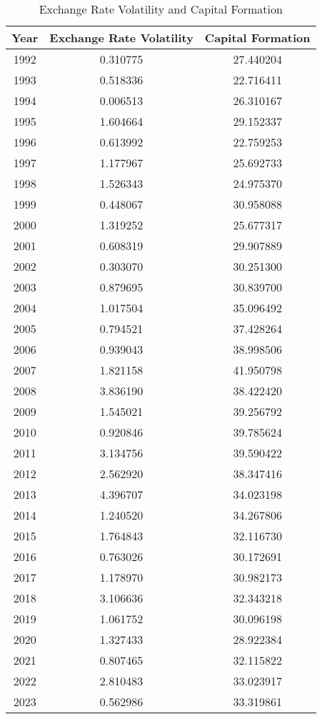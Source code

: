 \documentclass{article} %
\begin{document}
\begin{table}[h]
    \centering
    \caption{Exchange Rate Volatility and Capital Formation}
    \begin{tabular}{ccc}
        \toprule
        Year & Exchange Rate Volatility & Capital Formation \\
        \midrule
        1992 & 0.310775 & 27.440204 \\
        1993 & 0.518336 & 22.716411 \\
        1994 & 0.006513 & 26.310167 \\
        1995 & 1.604664 & 29.152337 \\
        1996 & 0.613992 & 22.759253 \\
        1997 & 1.177967 & 25.692733 \\
        1998 & 1.526343 & 24.975370 \\
        1999 & 0.448067 & 30.958088 \\
        2000 & 1.319252 & 25.677317 \\
        2001 & 0.608319 & 29.907889 \\
        2002 & 0.303070 & 30.251300 \\
        2003 & 0.879695 & 30.839700 \\
        2004 & 1.017504 & 35.096492 \\
        2005 & 0.794521 & 37.428264 \\
        2006 & 0.939043 & 38.998506 \\
        2007 & 1.821158 & 41.950798 \\
        2008 & 3.836190 & 38.422420 \\
        2009 & 1.545021 & 39.256792 \\
        2010 & 0.920846 & 39.785624 \\
        2011 & 3.134756 & 39.590422 \\
        2012 & 2.562920 & 38.347416 \\
        2013 & 4.396707 & 34.023198 \\
        2014 & 1.240520 & 34.267806 \\
        2015 & 1.764843 & 32.116730 \\
        2016 & 0.763026 & 30.172691 \\
        2017 & 1.178970 & 30.982173 \\
        2018 & 3.106636 & 32.343218 \\
        2019 & 1.061752 & 30.096198 \\
        2020 & 1.327433 & 28.922384 \\
        2021 & 0.807465 & 32.115822 \\
        2022 & 2.810483 & 33.023917 \\
        2023 & 0.562986 & 33.319861 \\
        \bottomrule
    \end{tabular}
\end{table}
\end{document}

